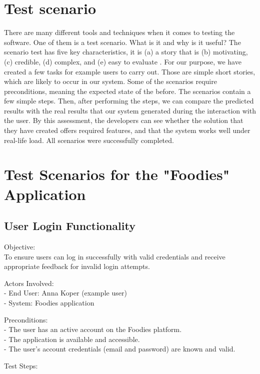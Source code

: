 \section{Test scenario}
\par
There are many different tools and techniques when it comes to testing the software. One of them is a test scenario. What is it and why is it useful? The scenario test has five key characteristics, it is (a) a story that is (b) motivating, (c) credible, (d) complex, and (e) easy to evaluate \cite{TestScenario}. For our purpose, we have created a few tasks for example users to carry out. Those are simple short stories, which are likely to occur in our system. Some of the scenarios require preconditions, meaning the expected state of the before. The scenarios contain a few simple steps. Then, after performing the steps, we can compare the predicted results with the real results that our system generated during the interaction with the user. By this assessment, the developers can see whether the solution that they have created offers required features, and that the system works well under real-life load. All scenarios were successfully completed.

\section{Test Scenarios for the "Foodies" Application}

\subsection{User Login Functionality}

Objective: \\
To ensure users can log in successfully with valid credentials and receive appropriate feedback for invalid login attempts.

Actors Involved: \\
- End User: Anna Koper (example user) \\
- System: Foodies application

Preconditions: \\
- The user has an active account on the Foodies platform. \\
- The application is available and accessible. \\
- The user's account credentials (email and password) are known and valid.

Test Steps: \\

